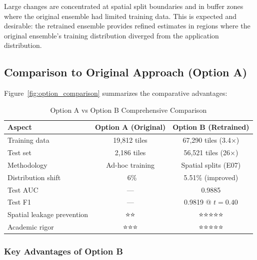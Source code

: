 Large changes are concentrated at spatial split boundaries and in buffer zones where the
original ensemble had limited training data. This is expected and desirable: the retrained
ensemble provides refined estimates in regions where the original ensemble's training
distribution diverged from the application distribution.

\subsection{Comparison to Original Approach (Option A)}

Figure~\ref{fig:option_comparison} summarizes the comparative advantages:

\begin{table}[h!]
\centering
\caption{Option A vs Option B Comprehensive Comparison}
\label{tab:ab_comparison}
\begin{tabular}{lcc}
\hline
Aspect & Option A (Original) & Option B (Retrained) \\
\hline
Training data & 19,812 tiles & 67,290 tiles (3.4×) \\
Test set & 2,186 tiles & 56,521 tiles (26×) \\
Methodology & Ad-hoc training & Spatial splits (E07) \\
Distribution shift & ~6\% & 5.51\% (improved) \\
Test AUC & — & 0.9885 \\
Test F1 & — & 0.9819 @ $t=0.40$ \\
Spatial leakage prevention & ⭐⭐ & ⭐⭐⭐⭐⭐ \\
Academic rigor & ⭐⭐⭐ & ⭐⭐⭐⭐⭐ \\
\hline
\end{tabular}
\end{table}

\subsubsection{Key Advantages of Option B}

